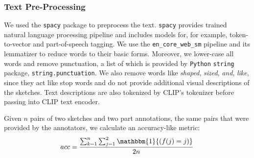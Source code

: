 
\subsubsection*{Text Pre-Processing} \label{text.preprocess}
We used the \texttt{spacy} package to preprocess the text. \texttt{spacy} provides trained natural language processing pipeline and includes models for, for example, token-to-vector and part-of-speech tagging. We use the \texttt{en\_core\_web\_sm} pipeline and its lemmatizer to reduce words to their basic forms. Moreover, we lower-case all words and remove punctuation, a list of which is provided by \texttt{Python} \texttt{string} package, \texttt{string.punctuation}. We also remove words like \textit{shaped}, \textit{sized}, \textit{and}, \textit{like}, since they act like stop words and do not provide additional visual descriptions of the sketches. Text descriptions are also tokenized by CLIP's tokenizer before passing into CLIP text encoder.     


Given $n$ pairs of two sketches and two part annotations, the same pairs that were provided by the annotators, we calculate an accuracy-like metric:
$$ acc = \frac{\sum_{k=1}^{n} \sum_{j=1}^2 \mathbbm{1}{(f(j) = j)}}{2n} $$

